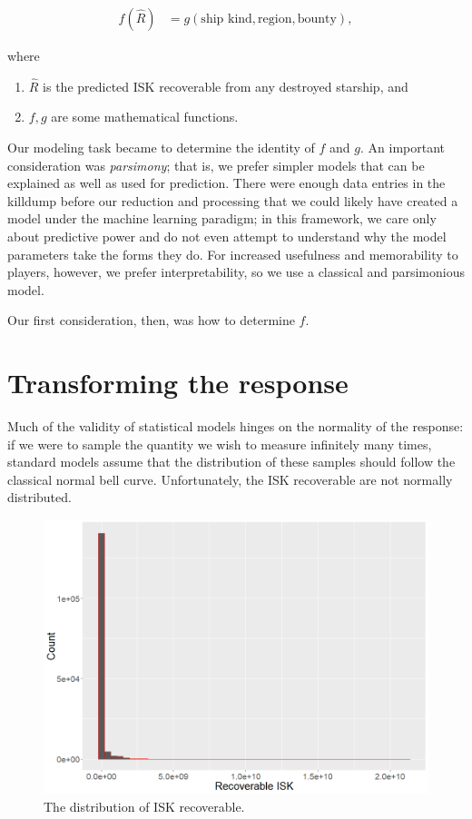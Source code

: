 \documentclass[letterpaper,12pt,article]{memoir}
\begin{document}
\begin{align} \label{eq:general}
    f(\widehat{R}) &= g(\textrm{ship kind},\textrm{region},\textrm{bounty}),
\end{align}

where
\begin{enumerate}[nolistsep,label=\textbf{--}]
    \item $\widehat{R}$ is the predicted ISK recoverable from any destroyed
    starship, and
    \item $f,g$ are some mathematical functions.
\end{enumerate}

Our modeling task became to determine the identity of $f$ and $g$. An important
consideration was \textit{parsimony}; that is, we prefer simpler models that can
be explained as well as used for prediction. There were enough data entries in 
the killdump before our reduction and processing that we could likely have created
a model under the machine learning paradigm; in this framework, we care only about
predictive power and do not even attempt to understand why the model parameters 
take the forms they do. For increased usefulness and memorability to players, 
however, we prefer interpretability, so we use a classical and parsimonious model.

Our first consideration, then, was how to determine $f$.

\section{Transforming the response}

Much of the validity of statistical models hinges on the normality of the response:
if we were to sample the quantity we wish to measure infinitely many times, standard
models assume that the distribution of these samples should follow the classical
normal bell curve. Unfortunately, the ISK recoverable are not normally distributed.

\begin{figure}[ht]
    \centering
    \includegraphics[width=4.5in]{Hist_ISKRecoverable.png}
    \caption{The distribution of ISK recoverable.}
    \label{fig:hist}
\end{figure}
\end{document}
